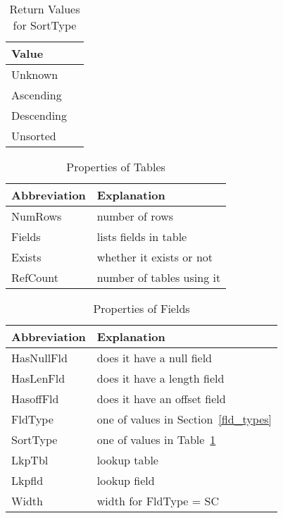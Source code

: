 \begin{table}
\centering
\begin{tabular}{|l|l|} \hline \hline
{\bf Value} \\ \hline \hline
Unknown \\ \hline
Ascending \\ \hline
Descending \\ \hline
Unsorted \\ \hline
\hline
\end{tabular}
\caption{Return Values for SortType} 
\label{srt_types}
\end{table}
\begin{table} \centering
\begin{tabular}{|l|l|} \hline \hline
{\bf Abbreviation} & {\bf Explanation} \\ \hline 
NumRows  & number of rows \\ \hline
Fields  & lists fields in table \\ \hline
Exists   & whether it exists or not \\ \hline
RefCount & number of tables using it \\ \hline
\hline
\end{tabular}
\caption{Properties of Tables}
\label{tbl_props}
\end{table}
\begin{table}
\centering
\begin{tabular}{|l|l|} \hline \hline
{\bf Abbreviation} & {\bf Explanation} \\ \hline 
HasNullFld  & does it have a null field  \\ \hline
HasLenFld & does it have a length field \\ \hline
HasoffFld & does it have an offset field \\ \hline
FldType & one of values in Section~\ref{fld_types} \\ \hline
SortType & one of values in Table~\ref{srt_types} \\ \hline
LkpTbl   & lookup table \\ \hline
Lkpfld   & lookup field \\ \hline
Width  & width for FldType = SC \\ \hline
\hline
\end{tabular}
\caption{Properties of Fields}
\label{fld_props}
\end{table}

